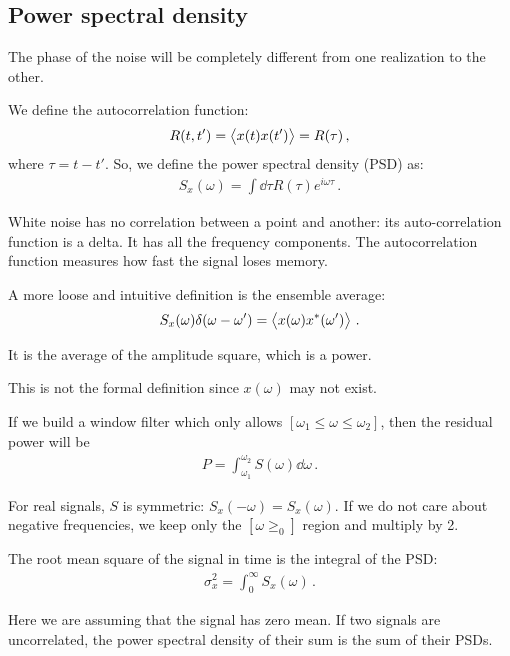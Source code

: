 \documentclass[main.tex]{subfiles}
\begin{document}
\subsection{Power spectral density}

The phase of the noise will be completely different from one realization to the other.

We define the autocorrelation function: 
%
\begin{align}
R(t, t')  = \expval{x(t) x(t')} = R(\tau) 
\,,
\end{align}
%
where \(\tau = t - t'\). So, we define the power spectral density (PSD) as:
%
\begin{align}
S_x (\omega ) = \int  \dd{\tau } R(\tau ) e^{i \omega \tau } 
\,.
\end{align}

White noise has no correlation between a point and another: its auto-correlation function is a delta. It has all the frequency components. 
The autocorrelation function measures how fast the signal loses memory. 

A more loose and intuitive definition is the ensemble average: 
%
\begin{align}
S_x(\omega ) \delta (\omega - \omega') = \expval{x(\omega ) x^{*} (\omega')}
\,.
\end{align}

It is the average of the amplitude square, which is a power.

This is not the formal definition since \(x(\omega )\) may not exist.

If we build a window filter which only allows \([\omega_1 \leq \omega \leq \omega_2 ]\), then the residual power will be 
%
\begin{align}
P = \int_{\omega_1 }^{\omega_2 } S(\omega ) \dd{\omega }
\,.
\end{align}

For real signals, \(S\) is symmetric: \(S_x (-\omega ) = S_x (\omega )\). 
If we do not care about negative frequencies, we keep only the \([\omega \geq_0 ]\) region and multiply by 2.

The root mean square of the signal in time is the integral of the PSD: 
%
\begin{align}
\sigma^2_{x} = \int_{0}^{ \infty } S_x (\omega )
\,.
\end{align}

Here we are assuming that the signal has zero mean.
If two signals are uncorrelated, the power spectral density of their sum is the sum of their PSDs. 
\end{document}
